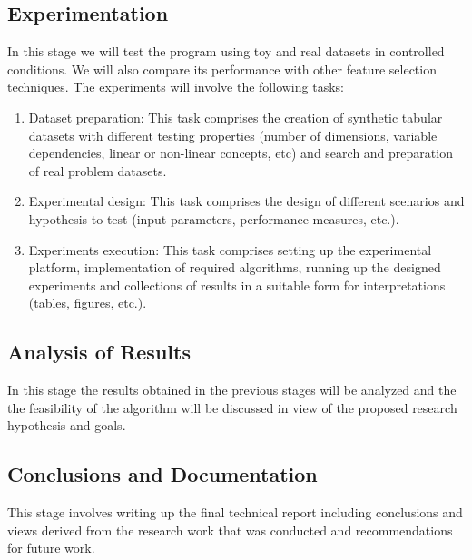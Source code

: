 \subsection{Experimentation}
In this stage we will test the program using toy and real datasets in controlled conditions. We will also compare its performance with other feature selection techniques. The experiments will involve the following tasks:
\begin{enumerate}
	\item Dataset preparation:  This task comprises the creation of synthetic tabular datasets with different testing properties (number of dimensions, variable dependencies, linear or non-linear concepts, etc) and search and preparation of real problem datasets.
	\item Experimental design:  This task comprises the design of different scenarios and hypothesis to test (input parameters, performance measures, etc.). 
	\item Experiments execution:  This task comprises setting up the experimental platform, implementation of required algorithms, running up the designed experiments and collections of results in a suitable form for interpretations (tables, figures, etc.).
\end{enumerate}

\subsection{Analysis of Results}
In this stage the results obtained in the previous stages will be analyzed and the the feasibility of the algorithm will be discussed in view of the proposed research hypothesis and goals.

\subsection{Conclusions and Documentation}
This stage involves writing up the final technical report including conclusions and views derived from the research work that was conducted and recommendations for future work.

\clearpage
